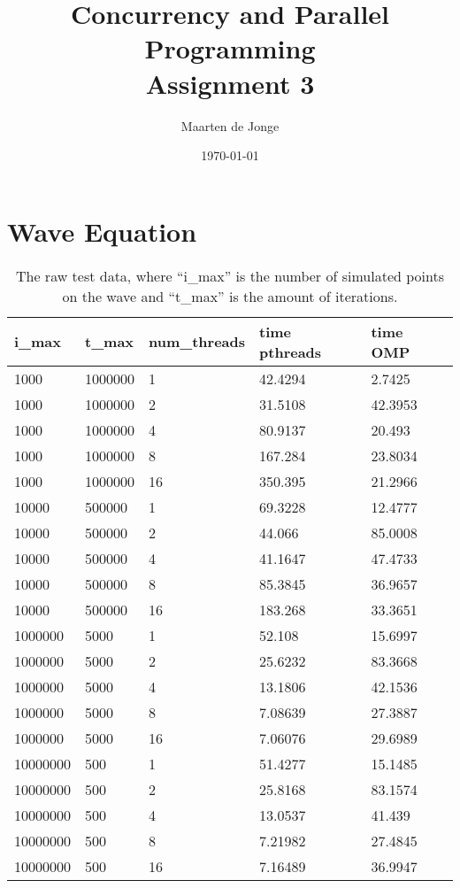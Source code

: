 \documentclass[a4paper]{article}
\author{Maarten de Jonge}
\date{\today}
\title{Concurrency and Parallel Programming \\
\large{Assignment 3}}
\begin{document}
\maketitle

\section*{Wave Equation}
\begin{table}[htbp]
    \centering
    \begin{tabular}{|l|l|l|l|l|}
        \hline
        i\_max    & t\_max   & num\_threads & time pthreads   & time OMP \\
        \hline
        1000     & 1000000 & 1           & 42.4294 & 2.7425  \\
        1000     & 1000000 & 2           & 31.5108 & 42.3953 \\
        1000     & 1000000 & 4           & 80.9137 & 20.493  \\
        1000     & 1000000 & 8           & 167.284 & 23.8034 \\
        1000     & 1000000 & 16          & 350.395 & 21.2966 \\
        10000    & 500000  & 1           & 69.3228 & 12.4777 \\
        10000    & 500000  & 2           & 44.066  & 85.0008 \\
        10000    & 500000  & 4           & 41.1647 & 47.4733 \\
        10000    & 500000  & 8           & 85.3845 & 36.9657 \\
        10000    & 500000  & 16          & 183.268 & 33.3651 \\
        1000000  & 5000    & 1           & 52.108  & 15.6997 \\
        1000000  & 5000    & 2           & 25.6232 & 83.3668 \\
        1000000  & 5000    & 4           & 13.1806 & 42.1536 \\
        1000000  & 5000    & 8           & 7.08639 & 27.3887 \\
        1000000  & 5000    & 16          & 7.06076 & 29.6989 \\
        10000000 & 500     & 1           & 51.4277 & 15.1485 \\
        10000000 & 500     & 2           & 25.8168 & 83.1574 \\
        10000000 & 500     & 4           & 13.0537 & 41.439  \\
        10000000 & 500     & 8           & 7.21982 & 27.4845 \\
        10000000 & 500     & 16          & 7.16489 & 36.9947 \\
        \hline
    \end{tabular}
    \caption{The raw test data, where ``i\_max'' is the number of simulated points
    on the wave and ``t\_max'' is the amount of iterations.}
    \label{table:results}
\end{table}
\end{document}
